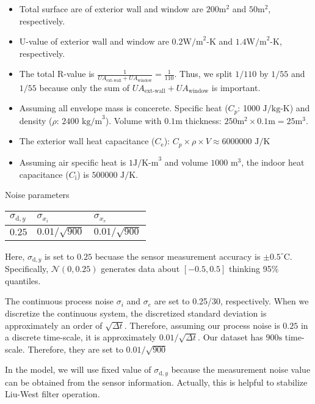 \documentclass[
]{article}
\providecommand{\tightlist}{%
  \setlength{\itemsep}{0pt}\setlength{\parskip}{0pt}}
\begin{document}
\begin{itemize}
\tightlist
\item
  Total surface are of exterior wall and window are \(200 \text{m}^2\)
  and \(50 \text{m}^2\), respectively.
\item
  U-value of exterior wall and window are \(0.2 \text{W/m}^2\text{-K}\)
  and \(1.4 \text{W/m}^2\text{-K}\), respectively.
\item
  The total R-value is
  \(\frac{1}{UA_{\text{ext-wall}}+UA_{\text{window}}}=\frac{1}{110}\).
  Thus, we split \(1/110\) by \(1/55\) and \(1/55\) because only the sum
  of \(UA_{\text{ext-wall}}+UA_{\text{window}}\) is important.
\item
  Assuming all envelope mass is concerete. Specific heat (\(C_p\): 1000
  \(\text{J/kg-K}\)) and density (\(\rho\): \(2400\text{ kg/m}^3\)).
  Volume with \(0.1\text{m}\) thickness:
  \(250\text{m}^2\times0.1\text{m}=25\text{m}^3\).
\item
  The exterior wall heat capacitance (\(C_{\text{e}}\)):
  \(C_p\times\rho\times V\approx6000000\text{ J/K}\)
\item
  Assuming air specific heat is \(1\text{J/K-m}^3\) and volume
  \(1000\text{ m}^3\), the indoor heat capacitance (\(C_{\text{i}}\)) is
  \(500000\text{ J/K}\).
\end{itemize}

Noise parameters

\begin{longtable}[]{@{}lll@{}}
\toprule
\(\sigma_{\text{d},y}\) & \(\sigma_{x_i}\) &
\(\sigma_{x_e}\)\tabularnewline
\midrule
\endhead
\(0.25\) & \(0.01/\sqrt{900}\) & \(0.01/\sqrt{900}\)\tabularnewline
\bottomrule
\end{longtable}

Here, \(\sigma_{\text{d},y}\) is set to \(0.25\) becuase the sensor
measurement accuracy is \(\pm{0.5} ^\circ\text{C}\). Specifically,
\(\mathcal{N}(0,0.25)\) generates data about \(\left[-0.5,0.5\right]\)
thinking 95\% quantiles.

The continuous process noise \(\sigma_i\) and \(\sigma_e\) are set to
0.25/30, respectively. When we discretize the continuous system, the
discretized standard deviation is approximately an order of
\(\sqrt{\Delta t}\). Therefore, assuming our process noise is \(0.25\)
in a discrete time-scale, it is approximately \(0.01/\sqrt{\Delta t}\).
Our dataset has \(900\text{s}\) time-scale. Therefore, they are set to
\(0.01/\sqrt{900}\)

In the model, we will use fixed value of \(\sigma_{\text{d},y}\) because
the measurement noise value can be obtained from the sensor information.
Actually, this is helpful to stabilize Liu-West filter operation.
\end{document}

